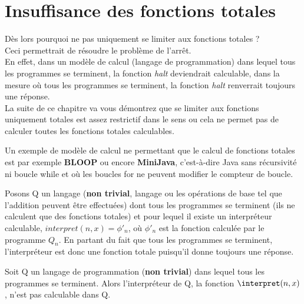 

\section{Insuffisance des fonctions totales}
\label{sub:insuffisance_des_fonctions_totales}
Dès lors pourquoi ne pas uniquement se limiter aux fonctions totales ?\\ 
Ceci permettrait de résoudre le problème de l'arrêt. \\
En effet, dans un modèle de calcul (langage de programmation) dans lequel tous les programmes se terminent, la fonction \emph{halt} deviendrait calculable, dans la mesure où tous les programmes se terminent, la fonction \textit{halt} renverrait toujours une réponse.\\
La suite de ce chapitre va vous démontrez que se limiter aux fonctions uniquement totales est assez restrictif dans le sens ou cela ne permet pas de calculer toutes les fonctions totales calculables.

\begin{myexem}
Un exemple de modèle de calcul ne permettant que le calcul de fonctions totales est par exemple \textbf{BLOOP} ou encore \textbf{MiniJava}, c'est-à-dire Java sans récursivité ni boucle while et où les boucles for ne peuvent modifier le compteur de boucle. 
\end{myexem}

Posons Q un langage (\textbf{non trivial}, langage ou les opérations de base tel que l'addition peuvent être effectuées) dont tous les programmes se terminent (ils ne calculent que des fonctions totales) et pour lequel il existe un interpréteur calculable, $interpret(n,x){} =\phi'_n$, où 
$\phi'_n$ est la fonction calculée par le programme $Q_n$. En partant du fait que tous les programmes se terminent, l'interpréteur est donc une fonction totale puisqu'il donne toujours une réponse.

\begin{mytheo}
	\label{Hoare_Allison}
Soit Q un langage de programmation (\textbf{non trivial}) dans lequel tous les programmes se terminent.	Alors l'interpréteur de Q, la fonction $\interpret(n,x)$, n'est pas calculable dans Q.
\end{mytheo}

